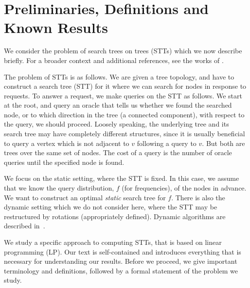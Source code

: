 \section{Preliminaries, Definitions and Known Results}
\label{section_preliminaries} 

We consider the problem of search trees on trees (STTs) which we now describe briefly. For a broader context and additional references, see the works of \cite{BerendsohnThesis, SplayTreesonTrees_andPTAS, TangoSTT, GolinskyThesis}.

The problem of STTs is as follows. We are given a tree topology, and have to construct a search tree (STT) for it where we can search for nodes in response to requests. To answer a request, we make queries on the STT as follows. We start at the root, and query an oracle that tells us whether we found the searched node, or to which direction in the tree (a connected component), with respect to the query, we should proceed. Loosely speaking, the underlying tree and its search tree may have completely different structures, since it is usually beneficial to query a vertex which is not adjacent to $v$ following a query to $v$. But both are trees over the same set of nodes. The cost of a query is the number of oracle queries until the specified node is found.

We focus on the static setting, where the STT is fixed. In this case, we assume that we know the query distribution, $f$ (for frequencies), of the nodes in advance. We want to construct an optimal \emph{static} search tree for $f$. There is also the dynamic setting which we do not consider here, where the STT may be restructured by rotations (appropriately defined). Dynamic algorithms are described in~\cite{BerendsohnThesis, SplayTreesonTrees_andPTAS, TangoSTT}.

We study a specific approach to computing STTs, that is based on linear programming (LP). Our text is self-contained and introduces everything that is necessary for understanding our results. Before we proceed, we give important terminology and definitions, followed by a formal statement of the problem we study.

